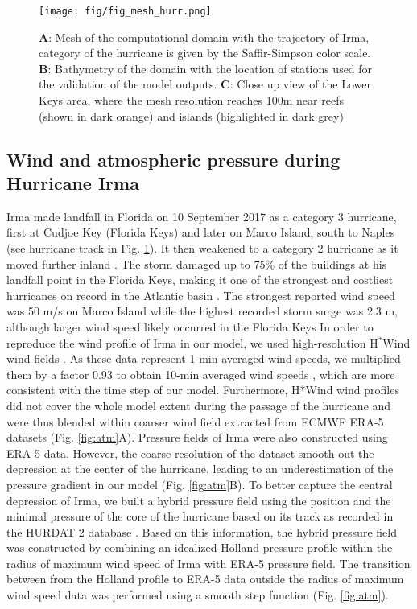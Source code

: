 \documentclass[preprint,12pt,authoryear]{elsarticle}
\begin{document}
\begin{figure}
    \centering
    \texttt{[image: fig/fig\_mesh\_hurr.png]}
    \caption{\textbf{A}: Mesh of the computational domain with the trajectory of Irma, category of the hurricane is given by the Saffir-Simpson color scale. \textbf{B}: Bathymetry of the domain with the location of stations used for the validation of the model outputs. \textbf{C}: Close up view of the Lower Keys area, where the mesh resolution reaches 100m near reefs (shown in dark orange) and islands (highlighted in dark grey)}
    \label{fig:mesh}
\end{figure}

\subsection{Wind and atmospheric pressure during Hurricane Irma}

Irma made landfall in Florida on 10 September 2017 as a category 3 hurricane, first at Cudjoe Key (Florida Keys) and later on Marco Island, south to Naples (see hurricane track in Fig. \ref{fig:mesh}). It then weakened to a category 2 hurricane as it moved further inland \citep{pinelli2018overview}. The storm damaged up to 75\% of the buildings at his landfall point in the Florida Keys, making it one of the strongest and costliest hurricanes on record in the Atlantic basin \citep{xian2018brief,zhang2019modeling}. The strongest reported wind speed was 50 m/s on Marco Island while the highest recorded storm surge was 2.3 m, although larger wind speed likely occurred in the Florida Keys \citep{pinelli2018overview}
In order to reproduce the wind profile of Irma in our model, we used high-resolution H$^\ast$Wind wind fields \citep{powell1998hrd}. As these data represent 1-min averaged wind speeds, we multiplied them by a factor 0.93 to obtain 10-min averaged wind speeds \citep{harper2010guidelines}, which are more consistent with the time step of our model. Furthermore, H*Wind wind profiles did not cover the whole model extent during the passage of the hurricane and were thus blended within coarser wind field extracted from ECMWF ERA-5 datasets (Fig. \ref{fig:atm}A). Pressure fields of Irma were also constructed using ERA-5 data. However, the coarse resolution of the dataset smooth out the depression at the center of the hurricane, leading to an underestimation of the pressure gradient in our model (Fig. \ref{fig:atm}B). To better capture the central depression of Irma, we built a hybrid pressure field using the position and the minimal pressure of the core of the hurricane based on its track as recorded in the HURDAT 2 database \citep{landsea2013atlantic}. Based on this information, the hybrid pressure field was constructed by combining an idealized Holland pressure profile \citep{lin2012hurricane} within the radius of maximum wind speed of Irma \citep{knaff2018statistical} with ERA-5 pressure field. The transition between from the Holland profile to ERA-5 data outside the radius of maximum wind speed data was performed using a smooth step function (Fig. \ref{fig:atm}).
\end{document}
